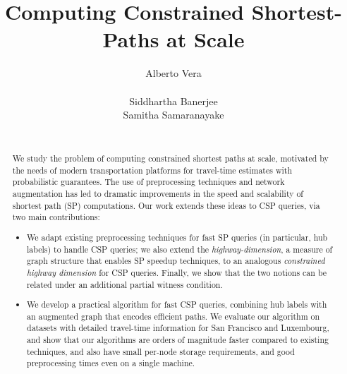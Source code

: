 \documentclass{vldb}
\begin{document}

\title{Computing Constrained Shortest-Paths at Scale}




\author{
\alignauthor
Alberto Vera\\
\\
\alignauthor
Siddhartha Banerjee
\\
\alignauthor
Samitha Samaranayake          \\               
\\
}

\maketitle

\begin{abstract}
We study the problem of computing constrained shortest paths at scale, motivated by the needs of modern transportation platforms for travel-time estimates with probabilistic guarantees. 
The use of preprocessing techniques and network augmentation has led to dramatic improvements in the speed and scalability of shortest path (SP) computations.
Our work extends these ideas to CSP queries, via two main contributions: 
\begin{itemize}[nosep,leftmargin=*]
\item We adapt existing preprocessing techniques for fast SP queries (in particular, hub labels) to handle CSP queries; we also extend the \emph{highway-dimension}, a measure of graph structure that enables SP speedup techniques, to an analogous \emph{constrained highway dimension} for CSP queries.
Finally, we show that the two notions can be related under an additional partial witness condition.
\item We develop a practical algorithm for fast CSP queries, combining hub labels with an augmented graph that encodes efficient paths. We evaluate our algorithm on datasets with detailed travel-time information for San Francisco and Luxembourg, and show that our algorithms are orders of magnitude faster compared to existing techniques, and also have small per-node storage requirements, and good preprocessing times even on a single machine. 
\end{itemize}	
\end{abstract}
\end{document}
